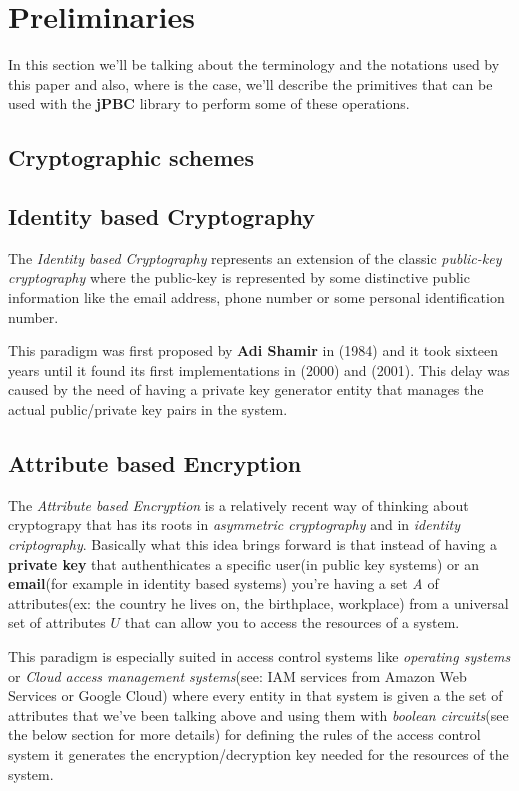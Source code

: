 \documentclass[12pt]{article}
\begin{document}
\section{Preliminaries}

In this section we'll be talking about the terminology and the notations used by this paper and also, where is the case, we'll describe the primitives that can be used with the \textbf{jPBC} library to perform some of these operations.  

\subsection{Cryptographic schemes}

\subsection{Identity based Cryptography}

The \textit{Identity based Cryptography} represents an extension of the classic \textit{public-key cryptography} where the public-key is represented by some distinctive public information like the email address, phone number or some personal identification number.

This paradigm was first proposed by \textbf{Adi Shamir} in \cite{shamirid}(1984) and it took sixteen years until it found its first implementations in \cite{sok}(2000) and \cite{bf}(2001). This delay was caused by the need of having a private key generator entity that manages the actual public/private key pairs in the system. 

\subsection{Attribute based Encryption}

The \textit{Attribute based Encryption} is a relatively recent way of thinking about cryptograpy that has its roots in \textit{asymmetric cryptography} and in \textit{identity criptography}. Basically what this idea brings forward is that instead of having a \textbf{private key} that authenthicates a specific user(in public key systems) or an \textbf{email}(for example in identity based systems) you're having a set \textit{A} of attributes(ex: the country he lives on, the birthplace, workplace) from a universal set of attributes $U$ that can allow you to access the resources of a system. 

This paradigm is especially suited in access control systems like \textit{operating systems} or \textit{Cloud access management systems}(see: IAM services from Amazon Web Services or Google Cloud) where every entity in that system is given a the set of attributes that we've been talking above and using them with \textit{boolean circuits}(see the below section for more details) for defining the rules of the access control system it generates the encryption/decryption key needed for the resources of the system.  
\end{document}
